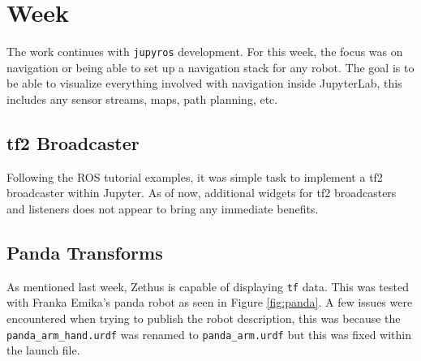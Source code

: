 \chapter{Week}

    The work continues with \texttt{jupyros} development. For this week, the focus was on navigation or being able to set up a navigation stack for any robot. The goal is to be able to visualize everything involved with navigation inside JupyterLab, this includes any sensor streams, maps, path planning, etc.

\section{tf2 Broadcaster}

    Following the ROS tutorial examples, it was simple task to implement a tf2 broadcaster within Jupyter. As of now, additional widgets for tf2 broadcasters and listeners does not appear to bring any immediate benefits.

    
    
    

\section{Panda Transforms}

    As mentioned last week, Zethus is capable of displaying \texttt{tf} data. This was tested with Franka Emika's panda robot as seen in Figure \ref{fig:panda}. A few issues were encountered when trying to publish the robot description, this was because the \texttt{panda\_arm\_hand.urdf} was renamed to \texttt{panda\_arm.urdf} but this was fixed within the launch file.

